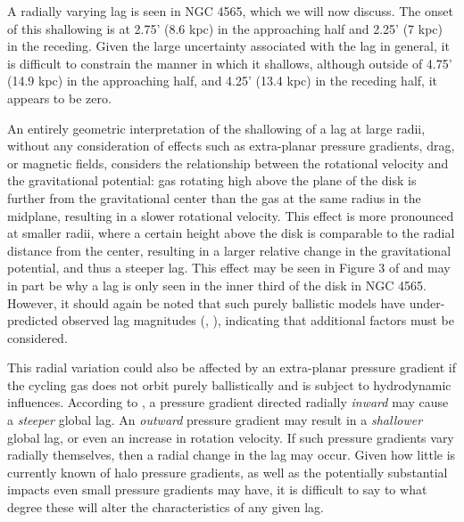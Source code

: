 \documentclass{emulateapj}
\begin{document}
\par
    A radially varying lag is seen in NGC 4565, which we will now discuss. The onset of this shallowing is at 2.75' (8.6 kpc) in the approaching half and 2.25' (7 kpc) in the receding.  Given the large uncertainty associated with the lag in general, it is difficult to constrain the manner in which it shallows, although outside of 4.75' (14.9 kpc) in the approaching half, and 4.25' (13.4 kpc) in the receding half, it appears to be zero.  

\par
    An entirely geometric interpretation of the shallowing of a lag at large radii, without any consideration of effects such as extra-planar pressure gradients, drag, or magnetic fields, considers the relationship between the rotational velocity and the gravitational potential:  gas rotating high above the plane of the disk is further from the gravitational center than the gas at the same radius in the midplane, resulting in a slower rotational velocity.  This effect is more pronounced at smaller radii, where a certain height above the disk is comparable to the radial distance from the center, resulting in a larger relative change in the gravitational potential, and thus a steeper lag. This effect may be seen in Figure 3 of \citet{2002ApJ...578...98C} and may in part be why a lag is only seen in the inner third of the disk in NGC 4565. However, it should again be noted that such purely ballistic models have under-predicted observed lag magnitudes (\citealt{2006MNRAS.366..449F}, \citealt{2007ApJ...663..933H}), indicating that additional factors must be considered. 

\par
    This radial variation could also be affected by an extra-planar pressure gradient if the cycling gas does not orbit purely ballistically and is subject to hydrodynamic influences. According to \citet{2002ASPC..276..201B}, a pressure gradient directed radially \textit{inward} may cause a \textit{steeper} global lag.   An \textit{outward} pressure gradient may result in a \textit{shallower} global lag, or even an increase in rotation velocity.  If such pressure gradients vary radially themselves, then a radial change in the lag may occur.  Given how little is currently known of halo pressure gradients, as well as the potentially substantial impacts even small pressure gradients may have, it is difficult to say to what degree these will alter the characteristics of any given lag.  
\end{document}
